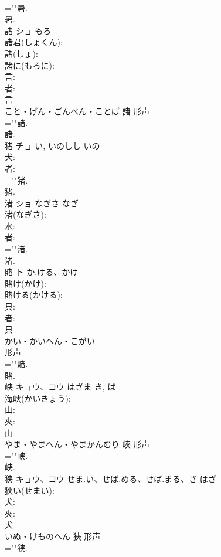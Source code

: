 \documentclass[8pt]{extreport}
\begin{document}
\begin{CJK}{UTF8}{min}
\\	=""暑.
\\	暑.
\\	諸	ショ	もろ		
\\	諸君(しょくん): 
\\	諸(しょ): 
\\	諸に(もろに): 
\\	言: 
\\	者: 
\\	言	
\\	こと・げん・ごんべん・ことば	諸	形声 
\\	=""諸.
\\	諸.
\\	猪	チョ	い, いのしし	いの	
\\	犬: 
\\	者: 
\\	=""猪.
\\	猪.
\\	渚	ショ	なぎさ	なぎ	
\\	渚(なぎさ): 
\\	水: 
\\	者: 
\\	=""渚.
\\	渚.
\\	賭	ト	か.ける、かけ		
\\	賭け(かけ): 
\\	賭ける(かける): 
\\	貝: 
\\	者: 
\\	貝	
\\	かい・かいへん・こがい	
\\	形声 
\\	=""賭.
\\	賭.
\\	峡	キョウ、コウ	はざま	き, ば	
\\	海峡(かいきょう): 
\\	山: 
\\	夾: 
\\	山	
\\	やま・やまへん・やまかんむり	峽	形声 
\\	=""峡.
\\	峡.
\\	狭	キョウ、コウ	せま.い、せば.める、せば.まる、さ	はざ	
\\	狭い(せまい): 
\\	犬: 
\\	夾: 
\\	犬	
\\	いぬ・けものへん	狹	形声 
\\	=""狭.

\end{CJK}
\end{document}
